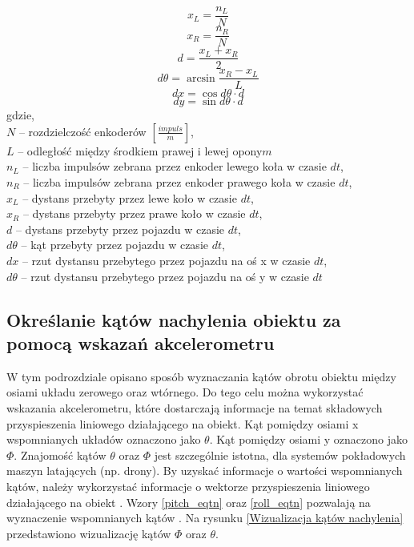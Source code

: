 {{        \begin{equation}
            x_L = \frac{n_L}{N} 
        \end{equation}
        \begin{equation}
            x_R = \frac{n_R}{N}
        \end{equation}
        \begin{equation}
            d = \frac{x_L + x_R}{2}
        \end{equation}
        \begin{equation}
            d\theta = \arcsin{\frac{x_R - x_L}{L} }
        \end{equation}
        \begin{equation}
            dx = \cos{d\theta} \cdot d
        \end{equation}
        \begin{equation}
            dy = \sin{d\theta} \cdot d
        \end{equation}
        gdzie,\\
        $N$ -- rozdzielczość enkoderów $[\frac{impuls}{m}]$,\\
        $L$ -- odległość między środkiem prawej i lewej opony${m}$\\
        $n_L$ -- liczba impulsów zebrana przez enkoder lewego koła w czasie $dt$,\\
        $n_R$ -- liczba impulsów zebrana przez enkoder prawego koła w czasie $dt$,\\
        $x_L$ -- dystans przebyty przez lewe koło w czasie $dt$,\\
        $x_R$ -- dystans przebyty przez prawe koło w czasie $dt$,\\
        $d$ -- dystans przebyty przez pojazdu w czasie $dt$,\\
        $d\theta$ -- kąt przebyty przez pojazdu w czasie $dt$,\\
        $dx$ -- rzut dystansu przebytego przez pojazdu na oś x w czasie $dt$,\\
        $d\theta$ -- rzut dystansu przebytego przez pojazdu na oś y w czasie  $dt$\\
    }
    \subsection{Określanie kątów nachylenia obiektu za pomocą wskazań akcelerometru}
    {
        W tym podrozdziale opisano sposób wyznaczania kątów obrotu obiektu między osiami układu zerowego oraz wtórnego. Do tego celu można wykorzystać wskazania akcelerometru, które dostarczają informacje na temat składowych przyspieszenia liniowego działającego na obiekt. Kąt pomiędzy osiami x wspomnianych układów oznaczono jako $\theta$. Kąt pomiędzy osiami y oznaczono jako $\Phi$. Znajomość kątów $\theta$ oraz $\Phi$ jest szczególnie istotna, dla systemów pokładowych maszyn latających (np. drony). By uzyskać informacje o wartości wspomnianych kątów, należy wykorzystać informacje o wektorze przyspieszenia liniowego działającego na obiekt \cite{rp_acc}. Wzory \ref{pitch_eqtn} oraz \ref{roll_eqtn} pozwalają na wyznaczenie wspomnianych kątów \cite{rp_acc}. Na rysunku \ref{Wizualizacja kątów nachylenia} przedstawiono wizualizację kątów $\Phi$ oraz $\theta$.

}}
